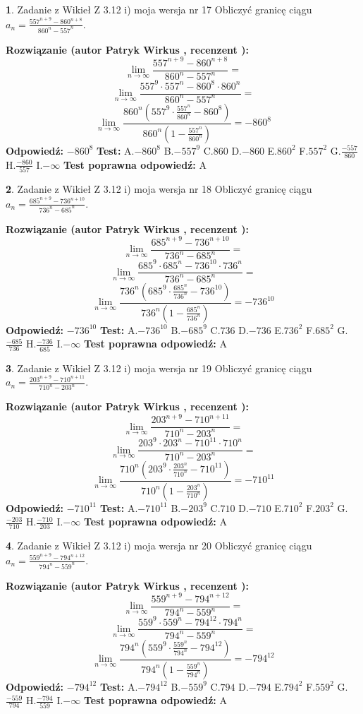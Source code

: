 \documentclass[12pt, a4paper]{article}
\theoremstyle{definition} %
\newtheorem{zad}{}
\newcommand{\zadStart}[1]{\begin{zad}#1\newline}
\newcommand{\zadStop}{\end{zad}}
\newcommand{\rozwStart}[2]{\noindent \textbf{Rozwiązanie (autor #1 , recenzent #2): }\newline}
\newcommand{\rozwStop}{\newline}
\newcommand{\odpStart}{\noindent \textbf{Odpowiedź:}\newline}
\newcommand{\odpStop}{\newline}
\newcommand{\testStart}{\noindent \textbf{Test:}\newline}
\newcommand{\testStop}{\newline}
\newcommand{\kluczStart}{\noindent \textbf{Test poprawna odpowiedź:}\newline}
\newcommand{\kluczStop}{\newline}
\begin{document}
\zadStart{Zadanie z Wikieł Z 3.12 i) moja wersja nr 17}
Obliczyć granicę ciągu $a_{n}=\frac{557^{n+9} - 860^{n+8}}{860^{n}-557^{n}}$.
\zadStop
\rozwStart{Patryk Wirkus}{}
$$\lim\limits_{n\to\infty}\frac{557^{n+9} - 860^{n+8}}{860^{n}-557^{n}}=$$
$$\lim\limits_{n\to\infty}\frac{557^{9} \cdot 557^{n} - 860^{8} \cdot 860^{n}}{860^{n}-557^{n}}=$$
$$\lim\limits_{n\to\infty}\frac{860^{n}(557^{9} \cdot \frac{557^{n}}{860^{n}} - 860^{8})}{860^{n}(1-\frac{557^{n}}{860^{n}})} = -860^{8}$$
\rozwStop
\odpStart
$-860^{8}$
\odpStop
\testStart
A.$-860^{8}$
B.$-557^{9}$
C.$860$
D.$-860$
E.$860^{2}$
F.$557^{2}$
G.$\frac{-557}{860}$
H.$\frac{-860}{557}$
I.$-\infty$
\testStop
\kluczStart
A
\kluczStop



\zadStart{Zadanie z Wikieł Z 3.12 i) moja wersja nr 18}
Obliczyć granicę ciągu $a_{n}=\frac{685^{n+9} - 736^{n+10}}{736^{n}-685^{n}}$.
\zadStop
\rozwStart{Patryk Wirkus}{}
$$\lim\limits_{n\to\infty}\frac{685^{n+9} - 736^{n+10}}{736^{n}-685^{n}}=$$
$$\lim\limits_{n\to\infty}\frac{685^{9} \cdot 685^{n} - 736^{10} \cdot 736^{n}}{736^{n}-685^{n}}=$$
$$\lim\limits_{n\to\infty}\frac{736^{n}(685^{9} \cdot \frac{685^{n}}{736^{n}} - 736^{10})}{736^{n}(1-\frac{685^{n}}{736^{n}})} = -736^{10}$$
\rozwStop
\odpStart
$-736^{10}$
\odpStop
\testStart
A.$-736^{10}$
B.$-685^{9}$
C.$736$
D.$-736$
E.$736^{2}$
F.$685^{2}$
G.$\frac{-685}{736}$
H.$\frac{-736}{685}$
I.$-\infty$
\testStop
\kluczStart
A
\kluczStop



\zadStart{Zadanie z Wikieł Z 3.12 i) moja wersja nr 19}
Obliczyć granicę ciągu $a_{n}=\frac{203^{n+9} - 710^{n+11}}{710^{n}-203^{n}}$.
\zadStop
\rozwStart{Patryk Wirkus}{}
$$\lim\limits_{n\to\infty}\frac{203^{n+9} - 710^{n+11}}{710^{n}-203^{n}}=$$
$$\lim\limits_{n\to\infty}\frac{203^{9} \cdot 203^{n} - 710^{11} \cdot 710^{n}}{710^{n}-203^{n}}=$$
$$\lim\limits_{n\to\infty}\frac{710^{n}(203^{9} \cdot \frac{203^{n}}{710^{n}} - 710^{11})}{710^{n}(1-\frac{203^{n}}{710^{n}})} = -710^{11}$$
\rozwStop
\odpStart
$-710^{11}$
\odpStop
\testStart
A.$-710^{11}$
B.$-203^{9}$
C.$710$
D.$-710$
E.$710^{2}$
F.$203^{2}$
G.$\frac{-203}{710}$
H.$\frac{-710}{203}$
I.$-\infty$
\testStop
\kluczStart
A
\kluczStop



\zadStart{Zadanie z Wikieł Z 3.12 i) moja wersja nr 20}
Obliczyć granicę ciągu $a_{n}=\frac{559^{n+9} - 794^{n+12}}{794^{n}-559^{n}}$.
\zadStop
\rozwStart{Patryk Wirkus}{}
$$\lim\limits_{n\to\infty}\frac{559^{n+9} - 794^{n+12}}{794^{n}-559^{n}}=$$
$$\lim\limits_{n\to\infty}\frac{559^{9} \cdot 559^{n} - 794^{12} \cdot 794^{n}}{794^{n}-559^{n}}=$$
$$\lim\limits_{n\to\infty}\frac{794^{n}(559^{9} \cdot \frac{559^{n}}{794^{n}} - 794^{12})}{794^{n}(1-\frac{559^{n}}{794^{n}})} = -794^{12}$$
\rozwStop
\odpStart
$-794^{12}$
\odpStop
\testStart
A.$-794^{12}$
B.$-559^{9}$
C.$794$
D.$-794$
E.$794^{2}$
F.$559^{2}$
G.$\frac{-559}{794}$
H.$\frac{-794}{559}$
I.$-\infty$
\testStop
\kluczStart
A
\kluczStop
\end{document}

